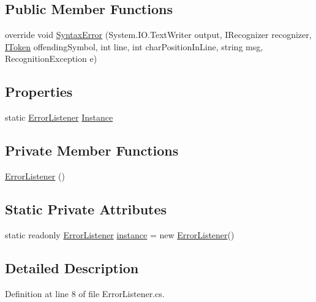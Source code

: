 \subsection*{Public Member Functions}
\begin{DoxyCompactItemize}
\item 
override void \hyperlink{a00094_a47fb9f6d50aa6a4e4796dea10b237fe4}{Syntax\-Error} (System.\-I\-O.\-Text\-Writer output, I\-Recognizer recognizer, \hyperlink{a00307_ae3d87b0b748ea892bff48f60862e182d}{I\-Token} offending\-Symbol, int line, int char\-Position\-In\-Line, string msg, Recognition\-Exception e)
\end{DoxyCompactItemize}
\subsection*{Properties}
\begin{DoxyCompactItemize}
\item 
static \hyperlink{a00094}{Error\-Listener} \hyperlink{a00094_a47b8f4f1d414afa1ea6067218c7ee34d}{Instance}
\end{DoxyCompactItemize}
\subsection*{Private Member Functions}
\begin{DoxyCompactItemize}
\item 
\hyperlink{a00094_a1f0cc41aac10bd8a2402355534c1123c}{Error\-Listener} ()
\end{DoxyCompactItemize}
\subsection*{Static Private Attributes}
\begin{DoxyCompactItemize}
\item 
static readonly \hyperlink{a00094}{Error\-Listener} \hyperlink{a00094_a9421873edea84c51d5905f5a24c62479}{instance} = new \hyperlink{a00094}{Error\-Listener}()
\end{DoxyCompactItemize}


\subsection{Detailed Description}


Definition at line 8 of file Error\-Listener.\-cs.



